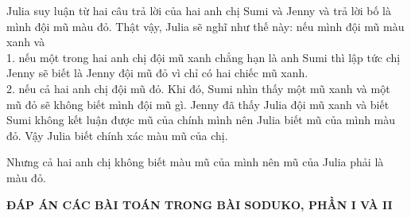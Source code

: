 Julia suy luận từ hai câu trả lời của hai anh chị Sumi và Jenny và trả lời bố là mình đội mũ màu đỏ. Thật vậy, Julia sẽ nghĩ như thế này: nếu mình đội mũ màu xanh và \\
1. nếu một trong hai anh chị đội mũ xanh chẳng hạn là anh Sumi thì lập tức chị Jenny sẽ biết là Jenny đội mũ đỏ vì chỉ có hai chiếc mũ xanh.\\
2.  nếu cả hai anh chị đội mũ đỏ. Khi đó, Sumi nhìn thấy một mũ xanh và một mũ đỏ sẽ không biết mình đội mũ gì. Jenny đã thấy Julia đội mũ xanh và biết Sumi không kết luận được mũ của chính mình nên Julia biết mũ của mình màu đỏ. Vậy Julia biết chính xác màu mũ của chị.

Nhưng cả hai anh chị không biết màu mũ của mình nên mũ của Julia phải là màu đỏ.

\newpage
\begin{center}
	\textbf{ĐÁP ÁN CÁC BÀI TOÁN TRONG BÀI SODUKO, PHẦN I VÀ II}
\end{center}
